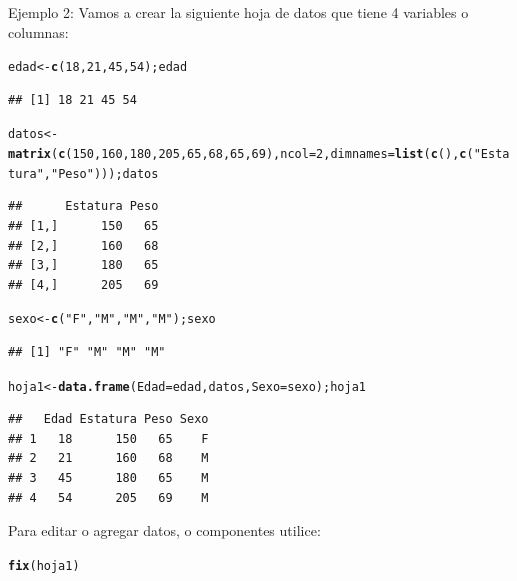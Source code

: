 \documentclass[12pt,letterpaper]{article}\usepackage[]{graphicx}\usepackage[]{color}
\makeatletter
\newcommand{\hlnum}[1]{\textcolor[rgb]{0.686,0.059,0.569}{#1}}%
\newcommand{\hlstr}[1]{\textcolor[rgb]{0.192,0.494,0.8}{#1}}%
\newcommand{\hlstd}[1]{\textcolor[rgb]{0.345,0.345,0.345}{#1}}%
\newcommand{\hlkwb}[1]{\textcolor[rgb]{0.69,0.353,0.396}{#1}}%
\newcommand{\hlkwc}[1]{\textcolor[rgb]{0.333,0.667,0.333}{#1}}%
\newcommand{\hlkwd}[1]{\textcolor[rgb]{0.737,0.353,0.396}{\textbf{#1}}}%
\newenvironment{kframe}{%
 \def\at@end@of@kframe{}%
 \ifinner\ifhmode%
  \def\at@end@of@kframe{\end{minipage}}%
  \begin{minipage}{\columnwidth}%
 \fi\fi%
 \def\FrameCommand##1{\hskip\@totalleftmargin \hskip-\fboxsep
 \colorbox{shadecolor}{##1}\hskip-\fboxsep
     \hskip-\linewidth \hskip-\@totalleftmargin \hskip\columnwidth}%
 \MakeFramed {\advance\hsize-\width
   \@totalleftmargin\z@ \linewidth\hsize
   \@setminipage}}%
 {\par\unskip\endMakeFramed%
 \at@end@of@kframe}
\newenvironment{knitrout}{}{} %
\makeatother
\begin{document}
Ejemplo 2: Vamos a crear la siguiente hoja de datos que tiene 4 variables o columnas: 
\begin{knitrout}
\color{fgcolor}\begin{kframe}
\begin{alltt}
\hlstd{edad} \hlkwb{<-} \hlkwd{c}\hlstd{(}\hlnum{18}\hlstd{,} \hlnum{21}\hlstd{,} \hlnum{45}\hlstd{,} \hlnum{54}\hlstd{); edad}
\end{alltt}
\begin{verbatim}
## [1] 18 21 45 54
\end{verbatim}
\begin{alltt}
\hlstd{datos} \hlkwb{<-} \hlkwd{matrix}\hlstd{(}\hlkwd{c}\hlstd{(}\hlnum{150}\hlstd{,} \hlnum{160}\hlstd{,} \hlnum{180}\hlstd{,} \hlnum{205}\hlstd{,} \hlnum{65}\hlstd{,} \hlnum{68}\hlstd{,} \hlnum{65}\hlstd{,} \hlnum{69}\hlstd{),} \hlkwc{ncol}\hlstd{=}\hlnum{2}\hlstd{,} \hlkwc{dimnames}\hlstd{=}\hlkwd{list}\hlstd{(}\hlkwd{c}\hlstd{(),} \hlkwd{c}\hlstd{(}\hlstr{"Estatura"}\hlstd{,}\hlstr{"Peso"}\hlstd{))); datos}
\end{alltt}
\begin{verbatim}
##      Estatura Peso
## [1,]      150   65
## [2,]      160   68
## [3,]      180   65
## [4,]      205   69
\end{verbatim}
\begin{alltt}
\hlstd{sexo} \hlkwb{<-} \hlkwd{c}\hlstd{(}\hlstr{"F"}\hlstd{,} \hlstr{"M"}\hlstd{,} \hlstr{"M"}\hlstd{,} \hlstr{"M"}\hlstd{); sexo}
\end{alltt}
\begin{verbatim}
## [1] "F" "M" "M" "M"
\end{verbatim}
\begin{alltt}
\hlstd{hoja1} \hlkwb{<-} \hlkwd{data.frame}\hlstd{(}\hlkwc{Edad}\hlstd{=edad, datos,} \hlkwc{Sexo}\hlstd{=sexo); hoja1}
\end{alltt}
\begin{verbatim}
##   Edad Estatura Peso Sexo
## 1   18      150   65    F
## 2   21      160   68    M
## 3   45      180   65    M
## 4   54      205   69    M
\end{verbatim}
\end{kframe}
\end{knitrout}

Para editar o agregar datos, o componentes utilice:
\begin{knitrout}
\color{fgcolor}\begin{kframe}
\begin{alltt}
\hlkwd{fix}\hlstd{(hoja1)}
\end{alltt}
\end{kframe}
\end{knitrout}
\end{document}
